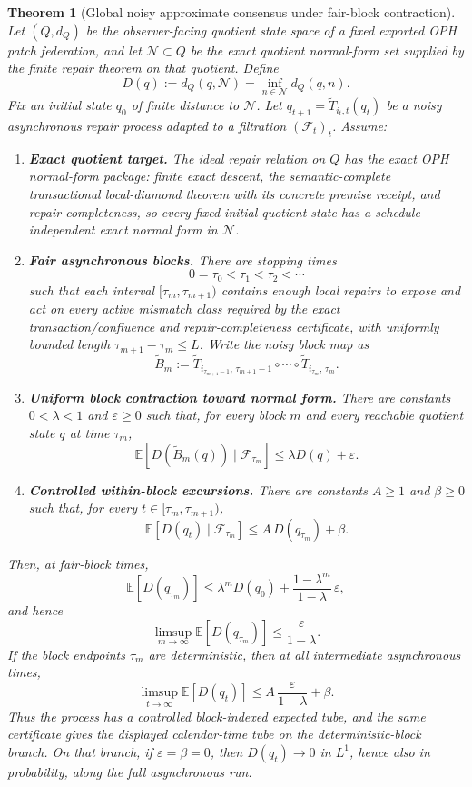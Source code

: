 \documentclass[11pt]{article}
\newtheorem{theorem}{Theorem}[section]
\theoremstyle{remark}
\theoremstyle{plain}
\begin{document}
\begin{theorem}[Global noisy approximate consensus under fair-block contraction]
\label{thm:noisy-fair-block-consensus}
Let \((Q,d_Q)\) be the observer-facing quotient state space of a fixed exported OPH patch
federation, and let \(\mathcal N\subset Q\) be the exact quotient normal-form set supplied by the
finite repair theorem on that quotient. Define
\[
D(q):=d_Q(q,\mathcal N)=\inf_{n\in\mathcal N}d_Q(q,n).
\]
Fix an initial state \(q_0\) of finite distance to \(\mathcal N\).
Let \(q_{t+1}=\widetilde T_{i_t,t}(q_t)\) be a noisy asynchronous repair
process adapted to a filtration \((\mathcal F_t)_t\). Assume:
\begin{enumerate}[(G1)]
\item \textbf{Exact quotient target.} The ideal repair relation on \(Q\) has the exact OPH
normal-form package: finite exact descent, the semantic-complete transactional local-diamond
theorem with its concrete premise receipt, and repair
completeness, so every fixed initial quotient state has a schedule-independent exact normal form
in \(\mathcal N\).
\item \textbf{Fair asynchronous blocks.} There are stopping times
\[
0=\tau_0<\tau_1<\tau_2<\cdots
\]
such that each interval \([\tau_m,\tau_{m+1})\) contains enough local repairs to expose and act on
every active mismatch class required by the exact transaction/confluence and repair-completeness
certificate, with uniformly bounded length \(\tau_{m+1}-\tau_m\le L\). Write the noisy block map
as
\[
\widetilde B_m
:=
\widetilde T_{i_{\tau_{m+1}-1},\,\tau_{m+1}-1}
\circ\cdots\circ
\widetilde T_{i_{\tau_m},\,\tau_m}.
\]
\item \textbf{Uniform block contraction toward normal form.} There are constants
\(0<\lambda<1\) and \(\varepsilon\ge0\) such that, for every block \(m\) and every reachable
quotient state \(q\) at time \(\tau_m\),
\[
\mathbb E\!\left[
D\!\left(\widetilde B_m(q)\right)
\mid \mathcal F_{\tau_m}
\right]
\le
\lambda D(q)+\varepsilon.
\]
\item \textbf{Controlled within-block excursions.} There are constants \(A\ge1\) and
\(\beta\ge0\) such that, for every \(t\in[\tau_m,\tau_{m+1})\),
\[
\mathbb E\!\left[
D(q_t)\mid \mathcal F_{\tau_m}
\right]
\le
A\,D(q_{\tau_m})+\beta.
\]
\end{enumerate}
Then, at fair-block times,
\[
\mathbb E[D(q_{\tau_m})]
\le
\lambda^mD(q_0)
+
\frac{1-\lambda^m}{1-\lambda}\,\varepsilon,
\]
and hence
\[
\limsup_{m\to\infty}\mathbb E[D(q_{\tau_m})]
\le
\frac{\varepsilon}{1-\lambda}.
\]
If the block endpoints \(\tau_m\) are deterministic, then at all intermediate
asynchronous times,
\[
\limsup_{t\to\infty}\mathbb E[D(q_t)]
\le
A\,\frac{\varepsilon}{1-\lambda}+\beta.
\]
Thus the process has a controlled block-indexed expected tube, and the same
certificate gives the displayed calendar-time tube on the deterministic-block
branch. On that branch, if \(\varepsilon=\beta=0\), then \(D(q_t)\to0\) in
\(L^1\), hence also in probability, along the full asynchronous run.
\end{theorem}
\end{document}
